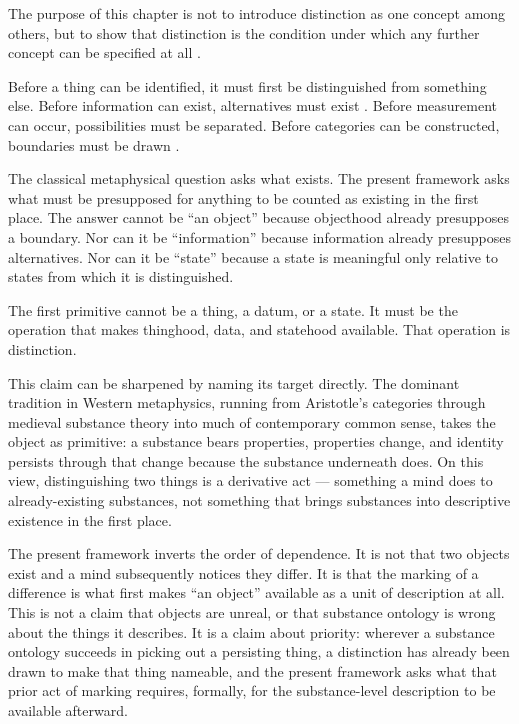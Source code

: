 \documentclass[12pt,twoside,openright]{book}
\begin{document}
The purpose of this chapter is not to introduce distinction
as one concept among others, but to show that distinction
is the condition under which any further concept can be
specified at all \parencite{spencer-brown1969}.

Before a thing can be identified, it must first be
distinguished from something else. Before information can
exist, alternatives must exist \parencite{bateson1972}.
Before measurement can occur, possibilities must be
separated. Before categories can be constructed, boundaries
must be drawn \parencite{luhmann1984}.

The classical metaphysical question asks what exists. The
present framework asks what must be presupposed for anything
to be counted as existing in the first place. The answer
cannot be ``an object'' because objecthood already
presupposes a boundary. Nor can it be ``information''
because information already presupposes alternatives. Nor
can it be ``state'' because a state is meaningful only
relative to states from which it is distinguished.

The first primitive cannot be a thing, a datum, or a state.
It must be the operation that makes thinghood, data, and
statehood available. That operation is distinction.

This claim can be sharpened by naming its target directly.
The dominant tradition in Western metaphysics, running from
Aristotle's categories through medieval substance theory
into much of contemporary common sense, takes the object as
primitive: a substance bears properties, properties change,
and identity persists through that change because the
substance underneath does. On this view, distinguishing two
things is a derivative act --- something a mind does to
already-existing substances, not something that brings
substances into descriptive existence in the first place.

The present framework inverts the order of dependence. It is
not that two objects exist and a mind subsequently notices
they differ. It is that the marking of a difference is what
first makes ``an object'' available as a unit of description
at all. This is not a claim that objects are unreal, or that
substance ontology is wrong about the things it describes. It
is a claim about priority: wherever a substance ontology
succeeds in picking out a persisting thing, a distinction has
already been drawn to make that thing nameable, and the
present framework asks what that prior act of marking
requires, formally, for the substance-level description to be
available afterward.
\end{document}
